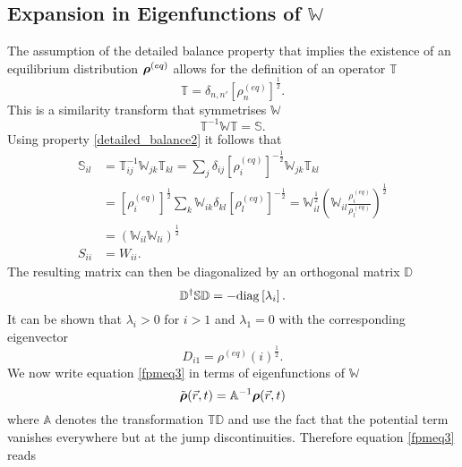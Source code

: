 \subsection{Expansion in Eigenfunctions of $\mathbb{W}$}
\label{Expansion_in_Eigenfunctions}
The assumption of the detailed balance property that implies the existence of an equilibrium distribution $\boldsymbol{\mathbf{\rho}}^{(eq)}$ allows for the definition of an operator $\mathbb{T}$
\begin{equation}
    \mathbb{T} = \delta_{n,n'} [\rho_n^{(eq)}]^{\frac{1}{2}}.
    \label{symmetrisation_transform}
\end{equation}
This is a similarity transform that symmetrises $\mathbb{W}$
\begin{equation}
    \mathbb{T}^{-1}\mathbb{W}\mathbb{T} = \mathbb{S}.
    \label{symm_rate_matrix}
\end{equation}
Using property \eqref{detailed_balance2} it follows that
\begin{align}
    \mathbb{S}_{il} &= \mathbb{T}^{-1}_{ij} \mathbb{W}_{jk} \mathbb{T}_{kl} = \sum_j \delta_{ij} [\rho^{(eq)}_i]^{-\frac{1}{2}} \mathbb{W}_{jk} \mathbb{T}_{kl} \\ \nonumber
    &= [\rho^{(eq)}_{i}]^{\frac{1}{2}} \sum_{k} \mathbb{W}_{ik} \delta_{kl} [\rho^{(eq)}_l]^{-\frac{1}{2}} = \mathbb{W}_{il}^{\frac{1}{2}} \left( \mathbb{W}_{il} \frac{\rho^{(eq)}_i}{\rho^{(eq)}_l} \right)^{\frac{1}{2}} \\ \nonumber
    &= \left(\mathbb{W}_{il} \mathbb{W}_{li}\right)^{\frac{1}{2}} \\ \nonumber
    S_{ii} &= W_{ii}.
\end{align}
The resulting matrix can then be diagonalized by an orthogonal matrix $\mathbb{D}$
\begin{equation}
    \mathbb{D}^{\dagger} \mathbb{S} \mathbb{D} = -{\rm diag}\left[ \lambda_i \right].
    \label{orthogonal_transform}
\end{equation}
It can be shown that $\lambda_i > 0$ for $i>1$ and $\lambda_1 = 0$ with the corresponding eigenvector
\begin{equation}
    D_{i1} = \rho^{(eq)}(i)^{\frac{1}{2}}.
\end{equation}
We now write equation \eqref{fpmeq3} in terms of eigenfunctions of $\mathbb{W}$
\begin{equation}
    \tilde{\boldsymbol{\mathbf{\rho}}}(\vec{r},t) = \mathbb{A}^{-1} \boldsymbol{\mathbf{\rho}}(\vec{r},t)
    \label{eigenfunctions}
\end{equation}
where $\mathbb{A}$ denotes the transformation $\mathbb{T}\mathbb{D}$ and use the fact that the potential term vanishes everywhere but at the jump discontinuities. Therefore equation \eqref{fpmeq3} reads
